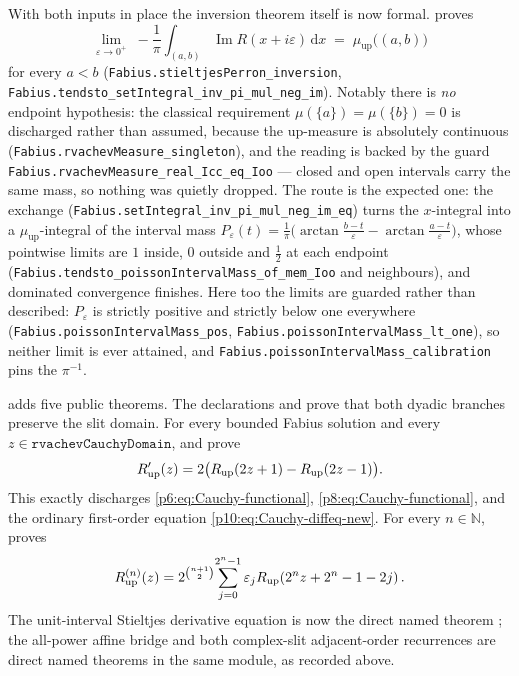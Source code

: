 \documentclass[11pt,oneside]{article}
\theoremstyle{definition}
\theoremstyle{remark}
\newcommand{\Up}{\operatorname{up}}
\newcommand{\N}{\mathbb N}
\newcommand{\dd}{\,\mathrm d}
\newcommand{\1}{\mathbf 1}
\DeclareMathOperator{\Ima}{Im}
\begin{document}
\begin{statusbox}
With both inputs in place the inversion theorem itself is now formal.
 proves
\[
  \lim_{\varepsilon\to0^{+}}\;-\frac1\pi\int_{(a,b)}\Ima R(x+i\varepsilon)\dd x\;=\;\mu_{\Up}\bigl((a,b)\bigr)
\]
for every $a<b$ (\nolinkurl{Fabius.stieltjesPerron\_inversion},
\nolinkurl{Fabius.tendsto\_setIntegral\_inv\_pi\_mul\_neg\_im}).  Notably there is \emph{no}
endpoint hypothesis: the classical requirement $\mu(\{a\})=\mu(\{b\})=0$ is discharged rather
than assumed, because the up-measure is absolutely continuous (\nolinkurl{Fabius.rvachevMeasure\_singleton}), and the reading is backed by the guard
\nolinkurl{Fabius.rvachevMeasure\_real\_Icc\_eq\_Ioo} --- closed and open intervals carry the same
mass, so nothing was quietly dropped.  The route is the expected one: the exchange
(\nolinkurl{Fabius.setIntegral\_inv\_pi\_mul\_neg\_im\_eq}) turns the $x$-integral into a
$\mu_{\Up}$-integral of the interval mass
$P_\varepsilon(t)=\tfrac1\pi\bigl(\arctan\frac{b-t}{\varepsilon}-\arctan\frac{a-t}{\varepsilon}\bigr)$, whose pointwise
limits are $1$ inside, $0$ outside and $\tfrac12$ at each endpoint
(\nolinkurl{Fabius.tendsto\_poissonIntervalMass\_of\_mem\_Ioo} and neighbours), and dominated
convergence finishes.  Here too the limits are guarded rather than described: $P_\varepsilon$
is strictly positive and strictly below one everywhere
(\nolinkurl{Fabius.poissonIntervalMass\_pos}, \nolinkurl{Fabius.poissonIntervalMass\_lt\_one}), so neither limit
is ever attained, and \nolinkurl{Fabius.poissonIntervalMass\_calibration} pins the $\pi^{-1}$.

 adds five public theorems.  The declarations
 and
 prove that both
dyadic branches preserve the slit domain.  For every bounded Fabius solution
and every \(z\in\mathtt{rvachevCauchyDomain}\),
 and
 prove
\[
 R_{\rm up}'(z)
 =2\bigl(R_{\rm up}(2z+1)-R_{\rm up}(2z-1)\bigr).
\]
This exactly discharges \eqref{p6:eq:Cauchy-functional},
\eqref{p8:eq:Cauchy-functional}, and the ordinary first-order equation
\eqref{p10:eq:Cauchy-diffeq-new}.  For every \(n\in\N\),
 proves
\[
 R_{\rm up}^{(n)}(z)
 =2^{\binom{n+1}{2}}\!
  \sum_{j=0}^{2^n-1}\varepsilon_j
   R_{\rm up}\!\left(2^nz+2^n-1-2j\right).
\]
The unit-interval Stieltjes derivative equation is now the direct named theorem
; the all-power affine bridge
and both complex-slit adjacent-order recurrences are direct named theorems in the same
module, as recorded above.


\end{statusbox}
\end{document}
